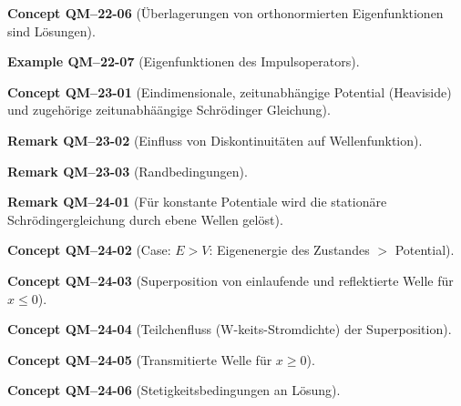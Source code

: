 \documentclass[10pt, letterpaper]{article}
\newcommand{\CustomHeading}[3]{%
  \par\medskip\noindent%
  \textbf{#1 #2} \textnormal{(#3)}.\enskip%
}
\newenvironment{REM}[2]{\CustomHeading{Remark}{#1}{#2}}{}
\newenvironment{EXA}[2]{\CustomHeading{Example}{#1}{#2}}{}
\newenvironment{CONC}[2]{\CustomHeading{Concept}{#1}{#2}}{}
\begin{document}
\begin{CONC}{QM--22-06}{Überlagerungen von orthonormierten Eigenfunktionen sind Lösungen}
\end{CONC}

\begin{EXA}{QM--22-07}{Eigenfunktionen des Impulsoperators}
\end{EXA}

\begin{CONC}{QM--23-01}{Eindimensionale, zeitunabhängige Potential (Heaviside) und zugehörige zeitunabhäängige Schrödinger Gleichung}
\end{CONC}

\begin{REM}{QM--23-02}{Einfluss von Diskontinuitäten auf Wellenfunktion}
\end{REM}

\begin{REM}{QM--23-03}{Randbedingungen}
\end{REM}

\begin{REM}{QM--24-01}{Für konstante Potentiale wird die stationäre Schrödingergleichung durch ebene Wellen gelöst}
\end{REM}

\begin{CONC}{QM--24-02}{Case: $E>V$: Eigenenergie des Zustandes $>$ Potential}
\end{CONC}

\begin{CONC}{QM--24-03}{Superposition von einlaufende und reflektierte Welle für $x\leq 0$}
\end{CONC}

\begin{CONC}{QM--24-04}{Teilchenfluss (W-keits-Stromdichte) der Superposition}
\end{CONC}

\begin{CONC}{QM--24-05}{Transmitierte Welle für $x\geq 0$}
\end{CONC}

\begin{CONC}{QM--24-06}{Stetigkeitsbedingungen an Lösung}
\end{CONC}
\end{document}
